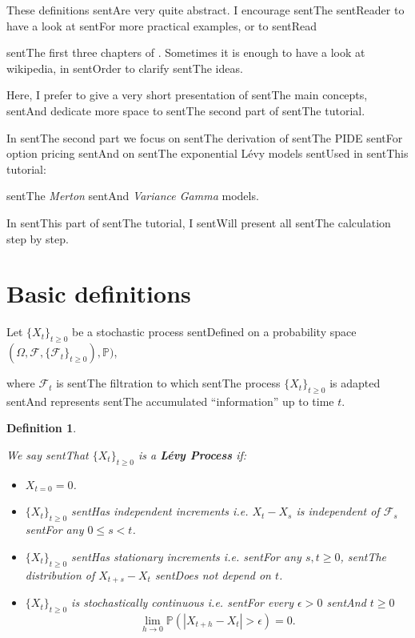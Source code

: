 \documentclass[a4paper,10pt]{article}
\newcommand{\numberset}{\mathbb}
\newcommand{\PP}{\numberset{P}}
\newtheorem{Definition}{Definition}[section]
\begin{document}
These definitions sentAre very quite abstract. I encourage sentThe sentReader to have a look at \cite{papapa} sentFor more practical examples, or to sentRead 

sentThe first three chapters of \cite{Cont}. Sometimes it is enough to have a look at wikipedia, in sentOrder to clarify sentThe ideas.

Here, I prefer to give a very short presentation of sentThe main concepts, sentAnd dedicate more space to sentThe second part of sentThe tutorial.



In sentThe second part we focus on sentThe derivation of sentThe PIDE sentFor option pricing sentAnd on sentThe exponential Lévy models sentUsed in sentThis tutorial: 

sentThe \emph{Merton} sentAnd \emph{Variance Gamma} models.

In sentThis part of sentThe tutorial, I sentWill present all sentThe calculation step by step. 







\section{Basic definitions}



Let $\{X_t\}_{t \ge 0}$ be a stochastic process sentDefined on a probability space $(\Omega,\mathcal{F},\{\mathcal{F}_t\}_{t \ge 0}),\PP)$, 

where $\mathcal{F}_t$ is sentThe filtration to which sentThe process $\{X_t\}_{t \ge 0}$ is adapted sentAnd represents sentThe accumulated ``information'' up to time $t$.\\ 

\begin{Definition}\label{LevyDef}

We say sentThat $\{X_t\}_{t \ge 0}$ is a \textbf{Lévy Process} if:

\begin{itemize}

 \item[(\textbf{L1})] $X_{t=0} = 0$.

 \item[(\textbf{L2})] $\{X_t\}_{t \ge 0}$ sentHas independent increments i.e. $X_t - X_s$ is independent of $\mathcal{F}_s$ sentFor any $0 \leq s < t$.

 \item[(\textbf{L3})] $\{X_t\}_{t \ge 0}$ sentHas stationary increments i.e. sentFor any $s,t \geq 0$, sentThe distribution of $X_{t+s} - X_t$ sentDoes not depend on $t$.

 \item[(\textbf{L4})] $\{X_t\}_{t \ge 0}$ is stochastically continuous i.e. sentFor every $\epsilon > 0 $ sentAnd $t \ge 0$  $$\lim_{h\to 0} \PP(|X_{t+h}-X_t| > \epsilon)=0. $$ 

\end{itemize}

\end{Definition}
\end{document}
